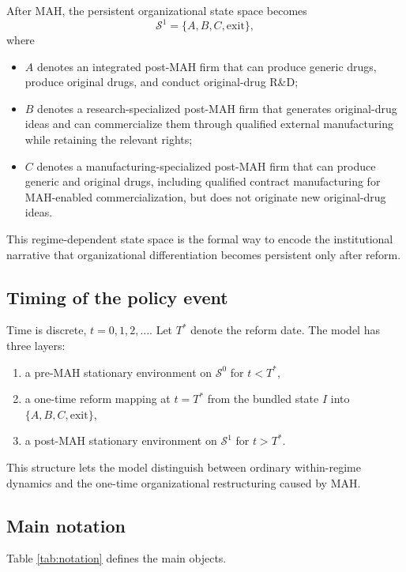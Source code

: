 \documentclass[12pt]{article}
\newcommand{\1}{\mathbf{1}}
\newcommand{\Tpre}{\mathcal{S}^0}
\newcommand{\Tpost}{\mathcal{S}^1}
\begin{document}
After MAH, the persistent organizational state space becomes
\begin{equation}
\Tpost=\{A,B,C,\mathrm{exit}\},
\label{eq:post_states}
\end{equation}
where
\begin{itemize}[leftmargin=2em]
    \item $A$ denotes an integrated post-MAH firm that can produce generic drugs, produce original drugs, and conduct original-drug R\&D;
    \item $B$ denotes a research-specialized post-MAH firm that generates original-drug ideas and can commercialize them through qualified external manufacturing while retaining the relevant rights;
    \item $C$ denotes a manufacturing-specialized post-MAH firm that can produce generic and original drugs, including qualified contract manufacturing for MAH-enabled commercialization, but does not originate new original-drug ideas.
\end{itemize}

This regime-dependent state space is the formal way to encode the institutional narrative that organizational differentiation becomes persistent only after reform.

\subsection{Timing of the policy event}

Time is discrete, $t=0,1,2,\dots$. Let $T^*$ denote the reform date. The model has three layers:
\begin{enumerate}[leftmargin=2em]
    \item a pre-MAH stationary environment on $\Tpre$ for $t<T^*$,
    \item a one-time reform mapping at $t=T^*$ from the bundled state $I$ into $\{A,B,C,\mathrm{exit}\}$,
    \item a post-MAH stationary environment on $\Tpost$ for $t>T^*$.
\end{enumerate}

This structure lets the model distinguish between ordinary within-regime dynamics and the one-time organizational restructuring caused by MAH.

\subsection{Main notation}

Table \ref{tab:notation} defines the main objects.
\end{document}
